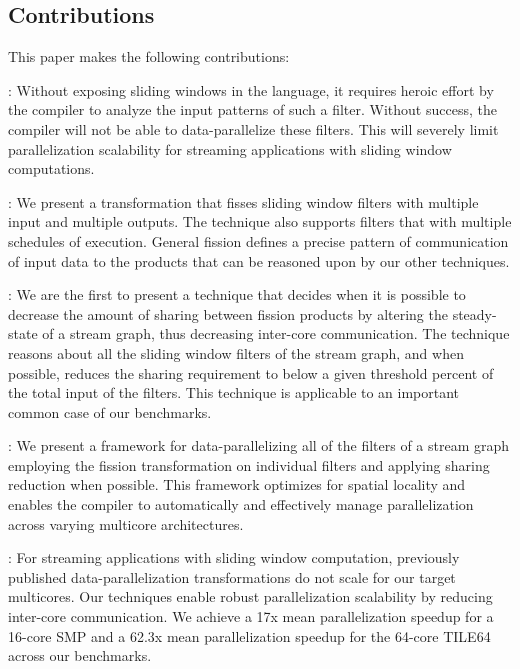 \subsection{Contributions}
This paper makes the following contributions:
\begin{itemize}
  : Without exposing sliding windows in the language, it
  requires heroic effort by the compiler to analyze the input patterns
  of such a filter. Without success, the compiler will not be able to
  data-parallelize these filters.  This will severely limit
  parallelization scalability for streaming applications with sliding
  window computations.

  : We present a
  transformation that fisses sliding window filters with multiple
  input and multiple outputs.  The technique also supports filters
  that with multiple schedules of execution.  General fission defines
  a precise pattern of communication of input data to the products
  that can be reasoned upon by our other techniques.

  : We are the first to present a technique
  that decides when it is possible to decrease the amount of sharing
  between fission products by altering the steady-state of a stream
  graph, thus decreasing inter-core communication.  The technique
  reasons about all the sliding window filters of the stream graph,
  and when possible, reduces the sharing requirement to below a given
  threshold percent of the total input of the filters.  This technique
  is applicable to an important common case of our benchmarks.

  : We present a
  framework for data-parallelizing all of the filters of a stream
  graph employing the fission transformation on individual filters and
  applying sharing reduction when possible.  This framework optimizes
  for spatial locality and enables the compiler to automatically and
  effectively manage parallelization across varying multicore
  architectures.

  : For
  streaming applications with sliding window computation, previously
  published data-parallelization transformations do not scale for our
  target multicores. Our techniques enable robust parallelization
  scalability by reducing inter-core communication.  We achieve a 17x
  mean parallelization speedup for a 16-core SMP and a 62.3x mean
  parallelization speedup for the 64-core TILE64 across our benchmarks.

\end{itemize}

